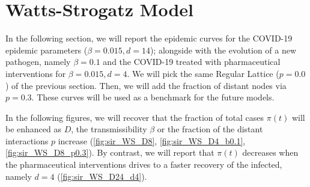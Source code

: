\documentclass[a4paper,10pt, oneside]{book} %
\theoremstyle{definition}
\begin{document}
\section{Watts-Strogatz Model}
\label{sec:res_WS_Model}
In the following section, we will report the epidemic curves for the COVID-19 epidemic parameters ($ \beta = 0.015, d = 14$); alongside with the evolution of a new pathogen, namely $ \beta = 0.1$ and the COVID-19 treated with pharmaceutical interventions for $ \beta = 0.015, d = 4$. We will pick the same Regular Lattice ($ p = 0.0 $) of the previous section. Then, we will add the fraction of distant nodes via $ p = 0.3$. These curves will be used as a benchmark for the future models.

In the following figures, we will recover that the fraction of total cases $\pi(t)$ will be enhanced as $ D$, the transmissibility $ \beta$ or the fraction of the distant interactions $ p$ increase (\autoref{fig:sir_WS_D8}, \autoref{fig:sir_WS_D4_b0.1}, \autoref{fig:sir_WS_D8_p0.3}). By contrast, we will report that $ \pi(t)$ decreases when the pharmaceutical interventions drives to a faster recovery of the infected, namely $ d = 4$ (\autoref{fig:sir_WS_D24_d4}).
\end{document}
